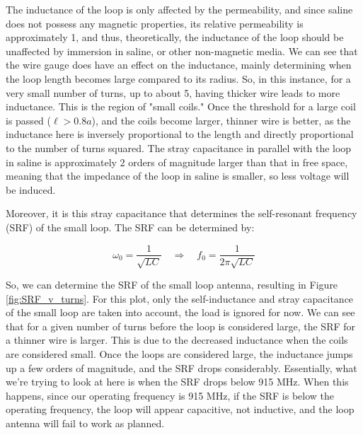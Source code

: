 \documentclass[12pt,onecolumn,titlepage]{article}
\begin{document}
The inductance of the loop is only affected by the permeability, and since saline does not possess any magnetic properties, its relative permeability is approximately 1, and thus, theoretically, the inductance of the loop should be unaffected by immersion in saline, or other non-magnetic media. We can see that the wire gauge does have an effect on the inductance, mainly determining when the loop length becomes large compared to its radius. So, in this instance, for a very small number of turns, up to about 5, having thicker wire leads to more inductance. This is the region of "small coils." Once the threshold for a large coil is passed ($\ell > 0.8a$), and the coils become larger, thinner wire is better, as the inductance here is inversely proportional to the length and directly proportional to the number of turns squared. The stray capacitance in parallel with the loop in saline is approximately 2 orders of magnitude larger than that in free space, meaning that the impedance of the loop in saline is smaller, so less voltage will be induced. 

Moreover, it is this stray capacitance that determines the self-resonant frequency (SRF) of the small loop. The SRF can be determined by:

\[ \omega_0 = \frac{1}{\sqrt{LC}} \quad \Rightarrow \quad f_0 = \frac{1}{2\pi \sqrt{LC}} \]

So, we can determine the SRF of the small loop antenna, resulting in Figure \ref{fig:SRF_v_turns}. For this plot, only the self-inductance and stray capacitance of the small loop are taken into account, the load is ignored for now. We can see that for a given number of turns before the loop is considered large, the SRF for a thinner wire is larger. This is due to the decreased inductance when the coils are considered small. Once the loops are considered large, the inductance jumps up a few orders of magnitude, and the SRF drops considerably. Essentially, what we're trying to look at here is when the SRF drops below 915 MHz. When this happens, since our operating frequency is 915 MHz, if the SRF is below the operating frequency, the loop will appear capacitive, not inductive, and the loop antenna will fail to work as planned.
\end{document}
